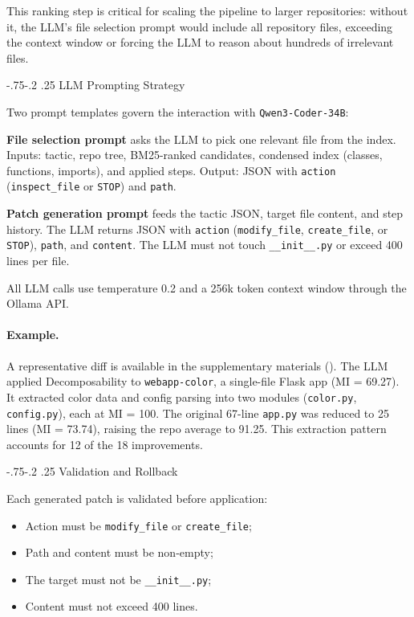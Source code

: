 \documentclass[sigconf,review,anonymous]{acmart}
\makeatletter
\renewcommand\subsubsection{\def\@toclevel{3}%
  \@startsection{subsubsection}{3}{\z@}%
  {-.75\baselineskip \@plus -2\p@ \@minus -.2\p@}%
  {.25\baselineskip}%
  {\ACM@NRadjust{\sffamily\bfseries\section@raggedright}}}
\makeatother
\begin{document}
This ranking step is critical for scaling the pipeline to larger repositories: without it, the LLM's file selection prompt would include all repository files, exceeding the context window or forcing the LLM to reason about hundreds of irrelevant files.

\subsubsection{LLM Prompting Strategy}

Two prompt templates govern the interaction with \texttt{Qwen3-Coder-34B}:

\textbf{File selection prompt} asks the LLM to pick one relevant file from the index. Inputs: tactic, repo tree, BM25-ranked candidates, condensed index (classes, functions, imports), and applied steps. Output: JSON with \texttt{action} (\texttt{inspect\_file} or \texttt{STOP}) and \texttt{path}.

\textbf{Patch generation prompt} feeds the tactic JSON, target file content, and step history. The LLM returns JSON with \texttt{action} (\texttt{modify\_file}, \texttt{create\_file}, or \texttt{STOP}), \texttt{path}, and \texttt{content}. The LLM must not touch \texttt{\_\_init\_\_.py} or exceed 400 lines per file.

All LLM calls use temperature 0.2 and a 256k token context window through the Ollama API.

\paragraph{Example.}
A representative diff is available in the supplementary materials (). The LLM applied Decomposability to \texttt{webapp-color}, a single-file Flask app (MI = 69.27). It extracted color data and config parsing into two modules (\texttt{color.py}, \texttt{config.py}), each at MI = 100. The original 67-line \texttt{app.py} was reduced to 25 lines (MI = 73.74), raising the repo average to 91.25. This extraction pattern accounts for 12 of the 18 improvements.

\subsubsection{Validation and Rollback}

Each generated patch is validated before application:
\begin{itemize}[nosep]
    \item Action must be \texttt{modify\_file} or \texttt{create\_file};
    \item Path and content must be non-empty;
    \item The target must not be \texttt{\_\_init\_\_.py};
    \item Content must not exceed 400 lines.
\end{itemize}
\end{document}
